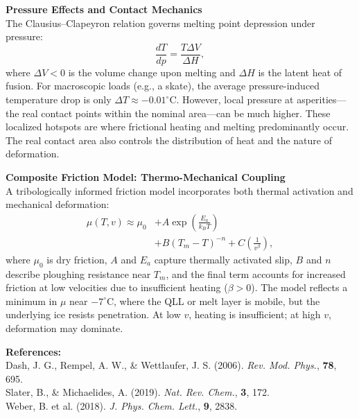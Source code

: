 \begin{technical}
\textbf{Pressure Effects and Contact Mechanics}\\[0.5em]
The Clausius–Clapeyron relation governs melting point depression under pressure:
\[
\frac{dT}{dp} = \frac{T \Delta V}{\Delta H},
\]
where $\Delta V < 0$ is the volume change upon melting and $\Delta H$ is the latent heat of fusion. For macroscopic loads (e.g., a skate), the average pressure-induced temperature drop is only $\Delta T \approx -0.01^\circ$C. However, local pressure at asperities—the real contact points within the nominal area—can be much higher. These localized hotspots are where frictional heating and melting predominantly occur. The real contact area also controls the distribution of heat and the nature of deformation.

\textbf{Composite Friction Model: Thermo-Mechanical Coupling}\\[0.5em]
A tribologically informed friction model incorporates both thermal activation and mechanical deformation:
\begin{align}
    \mu(T, v) \approx \mu_0 &+ A \exp\left(\frac{E_a}{k_B T}\right) \\&+ B (T_m - T)^{-n} + C \left( \frac{1}{v^\beta} \right),
\end{align}
where $\mu_0$ is dry friction, $A$ and $E_a$ capture thermally activated slip, $B$ and $n$ describe ploughing resistance near $T_m$, and the final term accounts for increased friction at low velocities due to insufficient heating ($\beta > 0$). The model reflects a minimum in $\mu$ near $-7^\circ$C, where the QLL or melt layer is mobile, but the underlying ice resists penetration. At low $v$, heating is insufficient; at high $v$, deformation may dominate.

\vspace{0.5em}
\textbf{References:}\\
Dash, J. G., Rempel, A. W., \& Wettlaufer, J. S. (2006). \textit{Rev. Mod. Phys.}, \textbf{78}, 695.\\
Slater, B., \& Michaelides, A. (2019). \textit{Nat. Rev. Chem.}, \textbf{3}, 172.\\
Weber, B. et al. (2018). \textit{J. Phys. Chem. Lett.}, \textbf{9}, 2838.

\end{technical}
